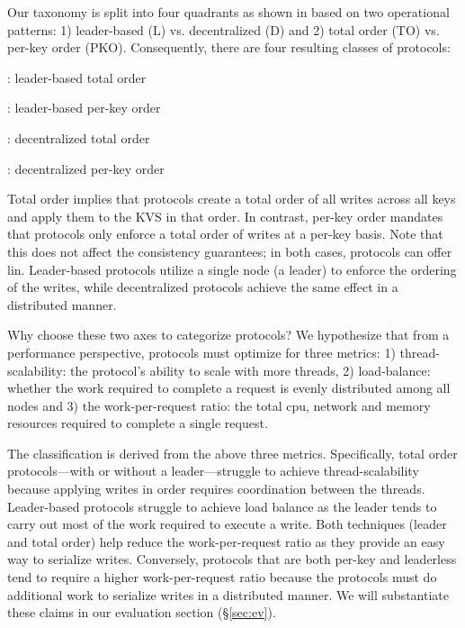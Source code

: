 Our taxonomy is split into four quadrants as shown in  based on two operational patterns: 1) leader-based (L) vs. decentralized (D) and 2) total order (TO) vs. per-key order (PKO). Consequently, there are four resulting classes of protocols:
\squishenum
\item \emph{\LTO}: leader-based total order 
\item \emph{\LPKO}: leader-based per-key order
\item \emph{\DTO}: decentralized total order 
\item \emph{\DPKO}: decentralized per-key order
\squishenumend

\custvspace
Total order implies that protocols create a total order of all writes across all keys and apply them to the KVS in that order. In contrast, per-key order mandates that protocols only enforce a total order of writes at a per-key basis. 
Note that this does not affect the consistency guarantees;
in both cases, protocols can offer lin.
Leader-based protocols utilize a single node (\ie a leader) to enforce the ordering of the writes, while decentralized protocols achieve the same effect in a distributed manner.



Why choose these two axes to categorize protocols?
We hypothesize that from a performance perspective, protocols must optimize for three metrics: 
1) thread-scalability: the protocol's ability to scale with more threads, 
2) load-balance: whether the work required to complete a request is evenly distributed among all nodes and 
3) the work-per-request ratio: the total cpu, network and memory resources required to complete a single request.

The classification is derived from the above three metrics.
Specifically, total order protocols---with or without a leader---struggle to achieve thread-scalability because applying writes in order requires coordination between the threads. 
Leader-based protocols struggle to achieve load balance as the leader tends to carry out most of the work required to execute a write. 
Both techniques (leader and total order)
help reduce the work-per-request ratio as they provide an easy way to serialize writes.
Conversely, protocols that are both per-key and leaderless tend to require a higher work-per-request ratio because the protocols must do additional work to serialize writes in a distributed manner.
We will substantiate these claims in our evaluation section (\S\ref{sec:ev}).


